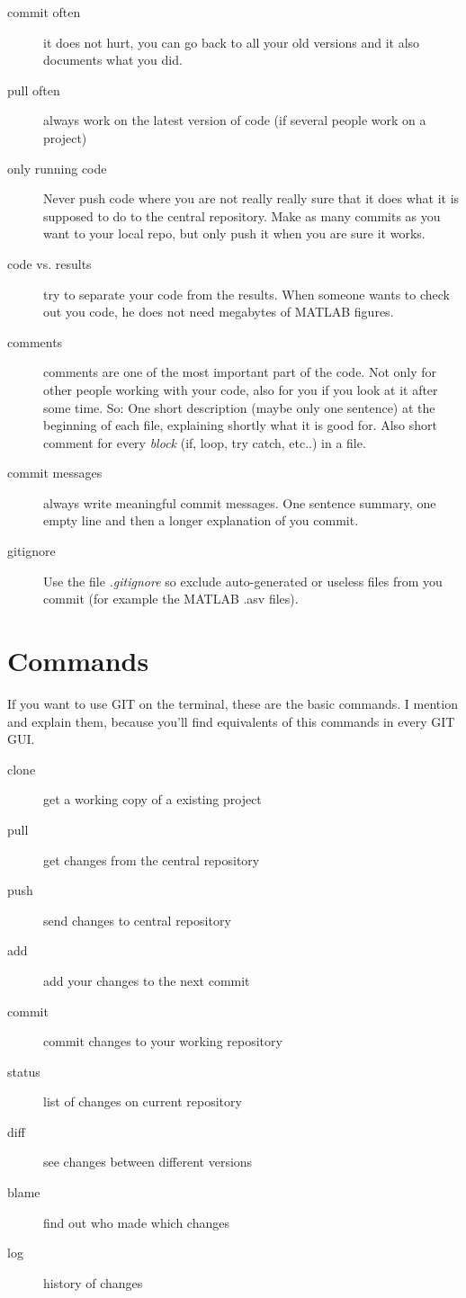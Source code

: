 \documentclass[]{article}
\begin{document}
\begin{description}
    \item[commit often] it does not hurt, you can go back to all your old versions and it also documents what you did.
    \item[pull often] always work on the latest version of code (if several people work on a project)
	\item[only running code] Never push code where you are not really really sure that it does what it is supposed to do to the central repository. Make as many commits as you want to your local repo, but only push it when you are sure it works.	
	\item[code vs. results] try to separate your code from the results. When someone wants to check out you code, he does not need megabytes of MATLAB figures.
	\item[comments] comments are one of the most important part of the code. Not only for other people working with your code, also for you if you look at it after some time. So: One short description (maybe only one sentence) at the beginning of each file, explaining shortly what it is good for. Also short comment for every \emph{block} (if, loop, try catch, etc..) in a file.
	\item[commit messages] always write meaningful commit messages. One sentence summary, one empty line and then a longer explanation of you commit.
	\item[gitignore] Use the file \emph{.gitignore} so exclude auto-generated or useless files from you commit (for example the MATLAB .asv files).
    
\end{description}
    

\section{Commands}

If you want to use GIT on the terminal, these are the basic commands.
I mention and explain them, because you'll find equivalents of this commands
in every GIT GUI.

\begin{description}
	\item[clone] get a working copy of a existing project
	\item[pull] get changes from the central repository
	\item[push] send changes to central repository
	\item[add] add your changes to the next commit
	\item[commit] commit changes to your working repository
	\item[status] list of changes on current repository
	\item[diff] see changes between different versions
	\item[blame] find out who made which changes
	\item[log] history of changes
\end{description}
\end{document}
